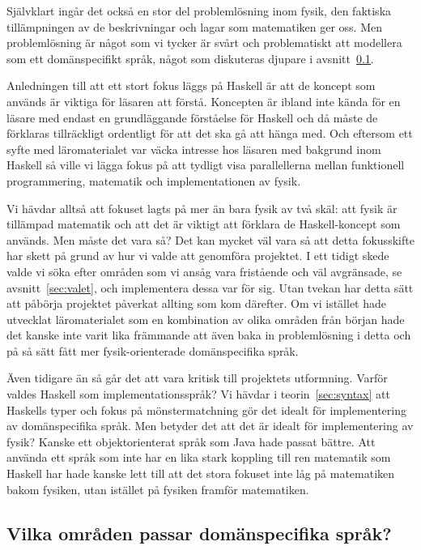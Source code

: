 Självklart ingår det också en stor del problemlösning inom fysik, den faktiska
tillämpningen av de beskrivningar och lagar som matematiken ger oss. Men
problemlösning är något som vi tycker är svårt och problematiskt att modellera
som ett domänspecifikt språk, något som diskuteras djupare i
avsnitt~\ref{sec:lampligt}.

Anledningen till att ett stort fokus läggs på Haskell är att de koncept som används är viktiga för läsaren att förstå. Koncepten är ibland inte kända för en läsare med endast en grundläggande förståelse för Haskell och då måste de förklaras tillräckligt ordentligt för att det ska gå att hänga med. Och
eftersom ett syfte med läromaterialet var väcka intresse hos läsaren med
bakgrund inom Haskell så ville vi lägga fokus på att tydligt visa
parallellerna mellan funktionell programmering, matematik och implementationen
av fysik. 

Vi hävdar alltså att fokuset lagts på mer än bara fysik av två skäl: att fysik är tillämpad matematik och att det är viktigt att förklara de Haskell-koncept som används. Men måste
det vara så? Det kan mycket väl vara så att detta fokusskifte har skett på grund
av hur vi valde att genomföra projektet. I ett tidigt skede valde vi söka efter
områden som vi ansåg vara fristående och väl avgränsade, se avsnitt~\ref{sec:valet},
och implementera dessa var för sig. Utan tvekan har detta sätt att påbörja
projektet påverkat allting som kom därefter. Om vi istället hade utvecklat
läromaterialet som en kombination av olika områden från början hade det kanske
inte varit lika främmande att även baka in problemlösning i detta och på så sätt
fått mer fysik-orienterade domänspecifika språk.

Även tidigare än så går det att vara kritisk till projektets utformning. Varför
valdes Haskell som implementationsspråk? Vi hävdar i teorin~\ref{sec:syntax} att
Haskells typer och fokus på mönstermatchning gör det idealt för implementering
av domänspecifika språk.  Men betyder det att det är idealt för implementering
av fysik? Kanske ett objektorienterat språk som Java hade passat bättre. Att
använda ett språk som inte har en lika stark koppling till ren matematik som
Haskell har hade kanske lett till att det stora fokuset inte låg på matematiken
bakom fysiken, utan istället på fysiken framför matematiken.

\subsection{Vilka områden passar domänspecifika språk?}\label{sec:lampligt}


